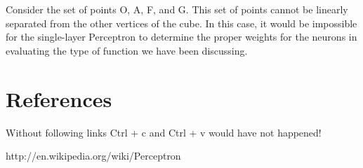 \documentclass[12pt, right open]{memoir}
\begin{document}
Consider the set of points O, A, F, and G. This set of points cannot be linearly
separated from the other vertices of the cube. In this case, it would be
impossible for the single-layer Perceptron to determine the proper weights for
the neurons in evaluating the type of function we have been discussing.
\chapter{References}
Without following links Ctrl + c and Ctrl + v would have not happened!

http://en.wikipedia.org/wiki/Perceptron
\end{document}
